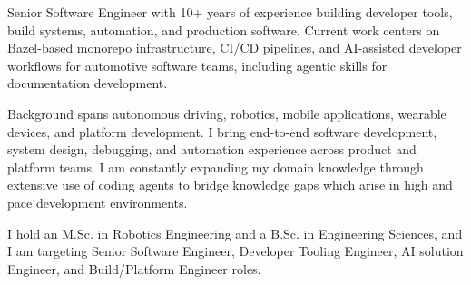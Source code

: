 
\begin{cvparagraph}
  Senior Software Engineer with 10+ years of experience building developer tools, build systems, automation, and production software. Current work centers on Bazel-based monorepo infrastructure, CI/CD pipelines, and AI-assisted developer workflows for automotive software teams, including agentic skills for documentation development. 

  Background spans autonomous driving, robotics, mobile applications, wearable devices, and platform development. I bring end-to-end software development, system design, debugging, and automation experience across product and platform teams. I am constantly expanding my domain knowledge through extensive use of coding agents to bridge knowledge gaps which arise in high and  pace development environments.


  I hold an M.Sc. in Robotics Engineering and a B.Sc. in Engineering Sciences, and I am targeting Senior Software Engineer, Developer Tooling Engineer, AI solution Engineer, and Build/Platform Engineer roles.
\end{cvparagraph}